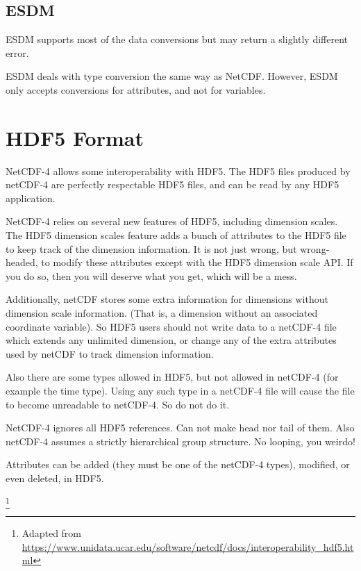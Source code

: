 \subsection{ESDM}

ESDM supports most of the data conversions but may return a slightly different error.

ESDM deals with type conversion the same way as NetCDF. However, ESDM only accepts conversions for attributes, and not for variables.




\section{HDF5 Format}

{\itshape

NetCDF-4 allows some interoperability with HDF5. The HDF5 files produced by netCDF-4 are perfectly respectable HDF5 files, and can be read by any HDF5 application.

NetCDF-4 relies on several new features of HDF5, including dimension scales. The HDF5 dimension scales feature adds a bunch of attributes to the HDF5 file to keep track of the dimension information.
It is not just wrong, but wrong-headed, to modify these attributes except with the HDF5 dimension scale API. If you do so, then you will deserve what you get, which will be a mess.

Additionally, netCDF stores some extra information for dimensions without dimension scale information. (That is, a dimension without an associated coordinate variable). So HDF5 users should not write data to a netCDF-4 file which extends any unlimited dimension, or change any of the extra attributes used by netCDF to track dimension information.

Also there are some types allowed in HDF5, but not allowed in netCDF-4 (for example the time type). Using any such type in a netCDF-4 file will cause the file to become unreadable to netCDF-4. So do not do it.

NetCDF-4 ignores all HDF5 references. Can not make head nor tail of them. Also netCDF-4 assumes a strictly hierarchical group structure. No looping, you weirdo!

Attributes can be added (they must be one of the netCDF-4 types), modified, or even deleted, in HDF5.
}\footnote{Adapted from \url{https://www.unidata.ucar.edu/software/netcdf/docs/interoperability_hdf5.html}}


